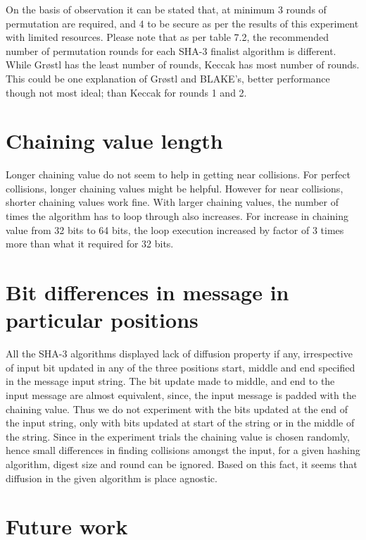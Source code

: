 On the basis of observation it can be stated that, at minimum 3 rounds of permutation are required, and 4 to 
be secure as per the results of this experiment with limited resources. Please note that as per table 7.2,
the recommended number of permutation rounds for each SHA-3 finalist algorithm is different. While Gr{\o}stl
has the least number of rounds, Keccak has most number of rounds. This could be one explanation of Gr{\o}stl
and BLAKE's, better performance though not most ideal; than Keccak for rounds 1 and 2.

\section{Chaining value length}

Longer chaining value do not seem to help in getting near collisions. For perfect collisions, longer chaining values
might be helpful. However for near collisions, shorter chaining values work fine. With larger chaining values,
the number of times the algorithm has to loop through also increases. For increase in chaining value from 32 bits
to 64 bits, the loop execution increased by factor of 3 times more than what it required for 32 bits.

\section{Bit differences in message in particular positions}

All the SHA-3 algorithms displayed lack of diffusion property if any, irrespective of input bit updated in any
of the three positions start, middle and end specified in the message input string. The bit update made to middle,
and end to the input message are almost equivalent, since, the input message is padded with the chaining value. 
Thus we do not experiment with the bits updated at the end of the input string, only with bits updated at start
of the string or in the middle of the string. Since in the experiment trials the chaining value is chosen randomly,
hence small differences in finding collisions amongst the input, for a given hashing algorithm, digest size and round
can be ignored. Based on this fact, it seems that diffusion in the given algorithm is place agnostic. 

\section{Future work}

